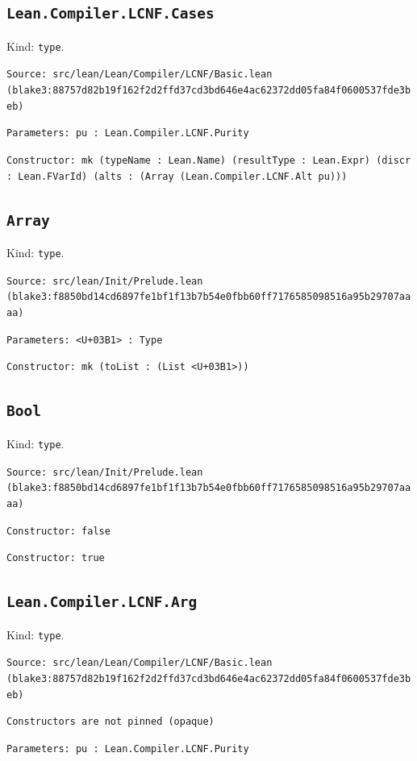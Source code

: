 \documentclass[11pt]{article}
\begin{document}
\subsection*{\texttt{Lean.Compiler.LCNF.Cases}}
\noindent Kind: \texttt{type}.\par
\noindent \texttt{Source: src/lean/Lean/Compiler/LCNF/Basic.lean (blake3:88757d82b19f162f2d2ffd37cd3bd646e4ac62372dd05fa84f0600537fde3beb)}\par
\noindent \texttt{Parameters: pu : Lean.Compiler.LCNF.Purity}\par
\noindent \texttt{Constructor: mk (typeName : Lean.Name) (resultType : Lean.Expr) (discr : Lean.FVarId) (alts : (Array (Lean.Compiler.LCNF.Alt pu)))}\par
\subsection*{\texttt{Array}}
\noindent Kind: \texttt{type}.\par
\noindent \texttt{Source: src/lean/Init/Prelude.lean (blake3:f8850bd14cd6897fe1bf1f13b7b54e0fbb60ff7176585098516a95b29707aaaa)}\par
\noindent \texttt{Parameters: <U+03B1> : Type}\par
\noindent \texttt{Constructor: mk (toList : (List <U+03B1>))}\par
\subsection*{\texttt{Bool}}
\noindent Kind: \texttt{type}.\par
\noindent \texttt{Source: src/lean/Init/Prelude.lean (blake3:f8850bd14cd6897fe1bf1f13b7b54e0fbb60ff7176585098516a95b29707aaaa)}\par
\noindent \texttt{Constructor: false }\par
\noindent \texttt{Constructor: true }\par
\subsection*{\texttt{Lean.Compiler.LCNF.Arg}}
\noindent Kind: \texttt{type}.\par
\noindent \texttt{Source: src/lean/Lean/Compiler/LCNF/Basic.lean (blake3:88757d82b19f162f2d2ffd37cd3bd646e4ac62372dd05fa84f0600537fde3beb)}\par
\noindent \texttt{Constructors are not pinned (opaque)}\par
\noindent \texttt{Parameters: pu : Lean.Compiler.LCNF.Purity}\par
\end{document}
